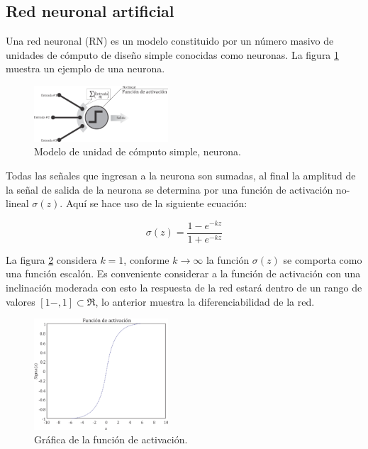 \subsection{Red neuronal artificial}
Una red neuronal (RN) es un modelo constituido por un
n\'umero masivo de unidades de c\'omputo de dise\~no simple
conocidas como neuronas. La figura \ref{fig:neurona}  muestra un ejemplo
de una neurona.

\begin{figure}[H]
	\centering
	\includegraphics[width=5cm]{img/fig_neuron.png}
	\caption{Modelo de unidad de c\'omputo simple, neurona.}
	\label{fig:neurona}
\end{figure}

Todas las se\~nales que ingresan a la neurona son sumadas,
al final la amplitud de la se\~nal de salida de la neurona se
determina por una funci\'on de activaci\'on no-lineal $\sigma(z)$. Aqu\'i
se hace uso de la siguiente ecuaci\'on: 

\begin{equation}
	\sigma(z)=\frac{1-e^{-kz}}{1+e^{-kz}}
\end{equation}

La figura \ref{fig:activa} considera $k=1$, conforme $k\rightarrow\infty$ la funci\'on
$\sigma(z)$ se comporta como una funci\'on escal\'on. Es conveniente
considerar a la funci\'on de activaci\'on con una inclinaci\'on
moderada con esto la respuesta de la red estar\'a dentro de un
rango de valores $\left[1-,1\right]\subset\Re$, lo anterior muestra la diferenciabilidad
de la red.

\begin{figure}[H]
	\centering
	\includegraphics[width=5cm]{img/fig_activationFunction.png}
	\caption{Gr\'afica de  la funci\'on de activaci\'on.}
	\label{fig:activa}
\end{figure}

